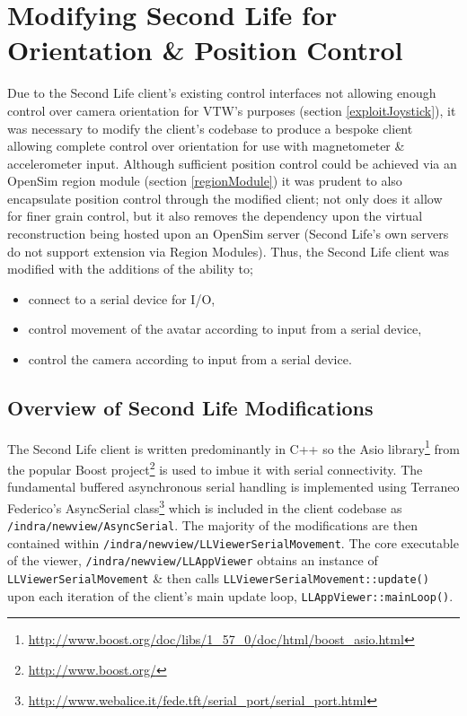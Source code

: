\section{Modifying Second Life for Orientation \& Position Control}

Due to the Second Life client's existing control interfaces not allowing enough control over camera orientation for VTW's purposes (section \ref{exploitJoystick}), it was necessary to modify the client's codebase to produce a bespoke client allowing complete control over orientation for use with magnetometer \& accelerometer input. Although sufficient position control could be achieved via an OpenSim region module (section \ref{regionModule}) it was prudent to also encapsulate position control through the modified client; not only does it allow for finer grain control, but it also removes the dependency upon the virtual reconstruction being hosted upon an OpenSim server (Second Life's own servers do not support extension via Region Modules). Thus, the Second Life client was modified with the additions of the ability to;

\begin{itemize}
	\item connect to a serial device for I/O,
	\item control movement of the avatar according to input from a serial device,
	\item control the camera according to input from a serial device.
\end{itemize}


\subsection{Overview of Second Life Modifications}

\newcommand{\asioFootnote}{\footnote{\url{http://www.boost.org/doc/libs/1_57_0/doc/html/boost_asio.html}}}

\newcommand{\boostFootnote}{\footnote{\url{http://www.boost.org/}}}

\newcommand{\fedetftFootnote}{\footnote{\url{http://www.webalice.it/fede.tft/serial_port/serial_port.html}}}



The Second Life client is written predominantly in C++ so the Asio library\asioFootnote{} from the popular Boost project\boostFootnote{} is used to imbue it with serial connectivity. The fundamental buffered asynchronous serial handling is implemented using Terraneo Federico's AsyncSerial class\fedetftFootnote{} which is included in the client codebase as \texttt{/indra/newview/AsyncSerial}. The majority of the modifications are then contained within \texttt{/indra/newview/LLViewerSerialMovement}. The core executable of the viewer, \texttt{/indra/newview/LLAppViewer} obtains an instance of \texttt{LLViewerSerialMovement} \& then calls \texttt{LLViewerSerialMovement::update()} upon each iteration of the client's main update loop, \texttt{LLAppViewer::mainLoop()}.

